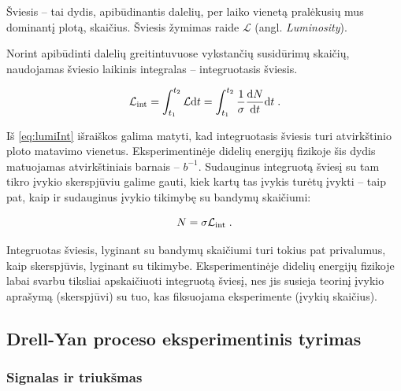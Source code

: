\documentclass[a4paper, 12pt]{article}
\newcommand{\Lumi}{{\cal L}_\mathrm{int}}
\newlength\q
\begin{document}
Šviesis -- tai dydis, apibūdinantis dalelių, per laiko vienetą pralėkusių mus dominantį plotą,
skaičius.
Šviesis žymimas raide $\mathcal{L}$ (angl. \textit{Luminosity}).

Norint apibūdinti dalelių greitintuvuose vykstančių susidūrimų skaičių, naudojamas šviesio
laikinis integralas -- integruotasis šviesis.

\begin{equation}
	\Lumi=\int_{t_1}^{t_2} \mathcal{L}\mathrm{d}t =
	\int_{t_1}^{t_2} \frac{1}{\sigma}\frac{\mathrm{d}N}{\mathrm{d}t} \mathrm{d}t \; .
\label{eq:lumiInt}
\end{equation}

Iš \eqref{eq:lumiInt} išraiškos galima matyti, kad integruotasis šviesis turi atvirkštinio ploto
matavimo vienetus.
Eksperimentinėje didelių energijų fizikoje šis dydis matuojamas atvirkštiniais barnais -- $b^{-1}$.
Sudauginus integruotą šviesį su tam tikro įvykio skerspjūviu galime gauti, kiek kartų tas įvykis
turėtų įvykti -- taip pat, kaip ir sudauginus įvykio tikimybę su bandymų skaičiumi:

\begin{equation}
	N=\sigma\Lumi \; .
\label{eq:evno}
\end{equation}

Integruotas šviesis, lyginant su bandymų skaičiumi turi tokius pat privalumus, kaip skerspjūvis,
lyginant su tikimybe.
Eksperimentinėje didelių energijų fizikoje labai svarbu tiksliai apskaičiuoti integruotą šviesį,
nes jis susieja teorinį įvykio aprašymą (skerspjūvi) su tuo, kas fiksuojama eksperimente (įvykių skaičius).


\subsection{Drell-Yan proceso eksperimentinis tyrimas}

\subsubsection{Signalas ir triukšmas}\label{sec:SignalBkg}
\end{document}
